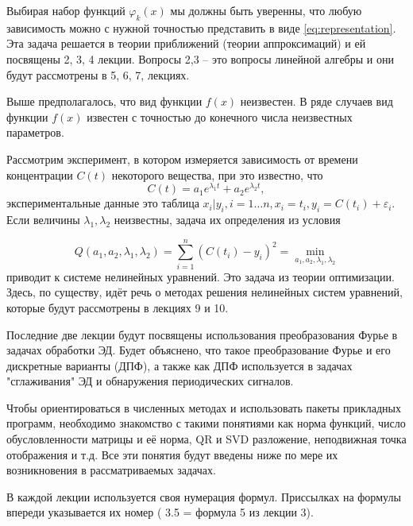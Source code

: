 Выбирая набор функций $\varphi _k(x)$ мы должны быть уверенны, что любую зависимость можно с нужной точностью представить в виде \ref{eq:representation}. Эта задача решается в теории приближений (теории аппроксимаций) и ей посвящены 2, 3, 4 лекции. Вопросы 2,3 -- это вопросы линейной алгебры и они будут рассмотрены в 5, 6, 7, лекциях.

Выше предполагалось, что вид функции $f(x)$ неизвестен. В ряде случаев вид функции  $f(x)$ известен с точностью до конечного числа неизвестных параметров.

Рассмотрим эксперимент, в котором измеряется зависимость от времени концентрации $C(t)$ некоторого вещества, при это известно, что 
\begin{equation}
	C(t) = a_1e^{\lambda_1 t} + a_2 e^{\lambda_2 t},
\end{equation}
экспериментальные данные это таблица $x_i | y_i, i=1\dots n, x_i = t_i, y_i = C(t_i) + \varepsilon_i$. Если величины $\lambda_1, \lambda_2$ неизвестны, задача их определения из условия

 \begin{equation}
	Q(a_1,a_2,\lambda_1, \lambda_2) = \sum^n_{i=1}{(C(t_i) -y_i)^2} = \min_{a_1,a_2,\lambda_1, \lambda_2}
\end{equation}
приводит к системе нелинейных уравнений. Это задача из теории оптимизации. Здесь, по существу, идёт речь о методах решения нелинейных систем уравнений, которые будут рассмотрены в лекциях 9 и 10.

Последние две лекции будут посвящены использования преобразования Фурье в задачах обработки ЭД. Будет объяснено, что такое преобразование Фурье и его дискретные варианты (ДПФ), а также как ДПФ используется в задачах "сглаживания" ЭД и обнаружения периодических сигналов.

Чтобы ориентироваться в численных методах и использовать пакеты прикладных программ, необходимо знакомство с такими понятиями как норма функций, число обусловленности матрицы и её норма, QR и SVD разложение, неподвижная точка отображения и т.д. Все эти понятия будут введены ниже по мере их возникновения в рассматриваемых задачах.

В каждой лекции используется своя нумерация формул. Приссылках на формулы впереди указывается их номер ( 3.5 = формула 5 из лекции 3).



